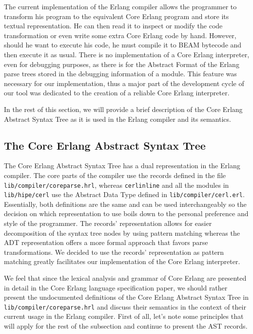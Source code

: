 The current implementation of the Erlang compiler allows the programmer to
transform his program to the equivalent Core Erlang program and store its
textual representation. He can then read it to inspect or modify the code
transformation or even write some extra Core Erlang code by hand. However,
should he want to execute his code, he must compile it to BEAM bytecode and
then execute it as usual. There is no implementation of a Core Erlang
interpreter, even for debugging purposes, as there is for the Abstract Format
of the Erlang parse trees stored in the debugging information of a module. This
feature was necessary for our implementation, thus a major part of the
development cycle of our tool was dedicated to the creation of a reliable Core
Erlang interpreter.

In the rest of this section, we will provide a brief description of the Core
Erlang Abstract Syntax Tree as it is used in the Erlang compiler and its
semantics.

\subsection{The Core Erlang Abstract Syntax Tree}\label{sub:core_erlang_ast}

The Core Erlang Abstract Syntax Tree has a dual representation in the Erlang
compiler. The core parts of the compiler use the records defined in the file
\texttt{lib/compiler/core\textunderscore parse.hrl}, whereas \texttt{cerl\textunderscore inline} and all the modules in
\texttt{lib/hipe/cerl} use the Abstract Data Type defined in \texttt{lib/compiler/cerl.erl}.
Essentially, both definitions are the same and can be used interchangeably so
the decision on which representation to use boils down to the personal
preference and style of the programmer. The records’ representation allows for
easier decomposition of the syntax tree nodes by using pattern matching whereas
the ADT representation offers a more formal approach that favors parse
transformations. We decided to use the records’ representation as pattern
matching greatly facilitates our implementation of the Core Erlang interpreter.

We feel that since the lexical analysis and grammar of Core Erlang are
presented in detail in the Core Erlang language specification paper, we should
rather present the undocumented definitions of the Core Erlang Abstract Syntax
Tree in \texttt{lib/compiler/core\textunderscore parse.hrl} and discuss their semantics in the context
of their current usage in the Erlang compiler. First of all, let’s note some
principles that will apply for the rest of the subsection and continue to
present the AST records.

